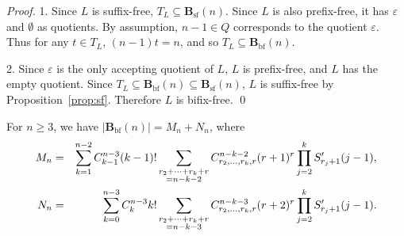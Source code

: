 \documentclass{llncs}
\renewcommand{\ge}{\geqslant}
\newcommand{\eps}{\varepsilon}
\newcommand{\emp}{\emptyset}
\newcommand{\Bsf}{\mathbf{B}_{\mathrm{sf}}}
\newcommand{\Bbf}{\mathbf{B}_{\mathrm{bf}}}
\begin{document}
\begin{proof}\mbox{}
1. Since $L$ is suffix-free,  $T_L \subseteq \Bsf(n)$. Since $L$ is also prefix-free,  it has $\eps$ and $\emp$ as quotients. By assumption, $n-1 \in Q$ corresponds to the quotient $\eps$. Thus for any $t \in T_L$, $(n-1) t = n$, and so $T_L \subseteq \Bbf(n)$. 

2. Since $\eps$ is the only accepting quotient of $L$, $L$ is prefix-free, and $L$ has the empty quotient. Since $T_L \subseteq \Bbf(n) \subseteq \Bsf(n)$,  $L$ is suffix-free by Proposition~\ref{prop:sf}. Therefore $L$ is bifix-free. \qed
\end{proof}

\begin{lemma}\label{lem:Hn} 
For $n \ge 3$, we have $|\Bbf(n)| = M_n + N_n$, where 
\begin{eqnarray} 
\label{eq:H1} 
  M_n &=& \sum_{k=1}^{n-2} C^{n-3}_{k-1} (k-1)! \sum_{\begin{subarray}{c} 
      r_2 + \cdots + r_k + r \\ 
          = n-k-2
    \end{subarray}}
    C^{n-k-2}_{r_2,\ldots,r_k,r} (r+1)^r \prod_{j=2}^k S'_{r_j+1}(j-1), \\
\label{eq:H2} 
  N_n &=& \sum_{k=0}^{n-3} C^{n-3}_k k! \sum_{\begin{subarray}{c} 
      r_2 + \cdots + r_k + r \\ 
          = n-k-3
    \end{subarray}}
    C^{n-k-3}_{r_2,\ldots,r_k,r} (r+2)^r \prod_{j=2}^k S'_{r_j+1}(j-1) .
\end{eqnarray}
\end{lemma}
\end{document}
